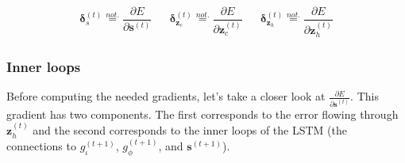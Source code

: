 \documentclass[11pt]{article}
\begin{document}
\begin{align}
     \boldsymbol{\delta}_{s}^{(t)} \overset{not.}{=}
     \dfrac{\partial E}{\partial \mathbf{s}^{(t)}}
  &&
     \boldsymbol{\delta}_{\mathbf{z}_c}^{(t)} \overset{not.}{=}
     \dfrac{\partial E}{\partial \mathbf{z}_c^{(t)}}
  &&
     \boldsymbol{\delta}_{\mathbf{z}_h}^{(t)} \overset{not.}{=}
     \dfrac{\partial E}{\partial \mathbf{z}_h^{(t)}}
\end{align}

\subsubsection*{Inner loops}

Before computing the needed gradients, let's take a closer look at
$\frac{\partial E}{\partial \mathbf{s}^{(t)}}$. This gradient has two
components. The first corresponds to the error flowing through
$\mathbf{z}_h^{(t)}$ and the second corresponds to the inner loops of
the LSTM (the connections to $g_{\iota}^{(t+1)}$, $g_{\phi}^{(t+1)}$,
and $\mathbf{s}^{(t+1)}$).
\end{document}
